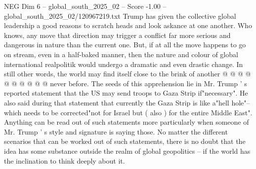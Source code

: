 \begin{textsample}{NEG Dim 6 – global\_south\_2025\_02 – Score -1.00 – global\_south\_2025\_02/120967219.txt}
Trump has given the collective global leadership a good reasons to scratch heads and look askance at one another.
Who knows, any move that direction may trigger a conflict far more serious and dangerous in nature than the current one.
But, if at all the move happens to go on stream, even in a half-baked manner, then the nature and colour of global international realpolitik would undergo a dramatic and even drastic change.
In still other words, the world may find itself close to the brink of another @ @ @ @ @ @ @ @ @ @ never before.
The seeds of this apprehension lie in Mr.
Trump ' s reported statement that the US may send troops to Gaza Strip if"necessary".
He also said during that statement that currently the Gaza Strip is like a"hell hole"-- which needs to be corrected"not for Israel but ( also ) for the entire Middle East".
Anything can be read out of such statements more particularly when someone of Mr.
Trump ' s style and signature is saying those.
No matter the different scenarios that can be worked out of such statements, there is no doubt that the idea has some substance outside the realm of global geopolitics -- if the world has the inclination to think deeply about it.

\end{textsample}
